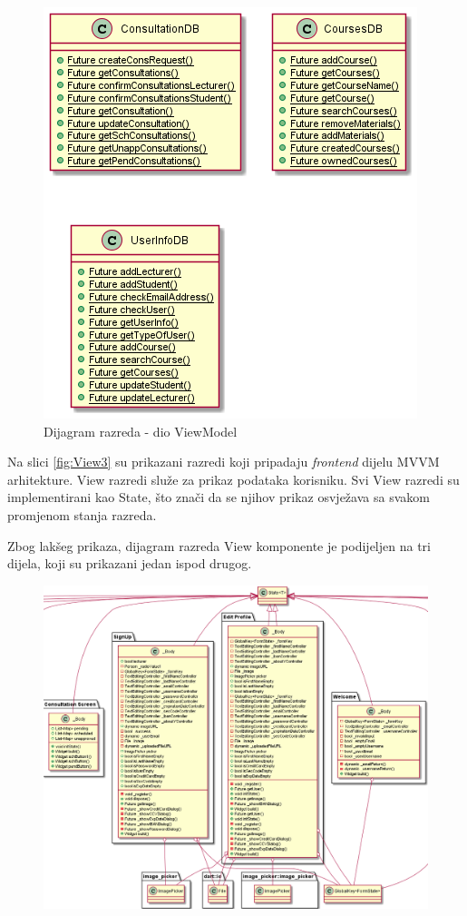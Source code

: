 			
			\begin{figure}[h]
				\includegraphics[scale=0.8]{dijagrami/ViewModel.PNG}
				\centering
				\caption{Dijagram razreda - dio ViewModel}
				\label{fig:ViewModel}
			\end{figure}
			
			Na slici \ref{fig:View3} su prikazani razredi koji pripadaju \textit{frontend} dijelu MVVM arhitekture. View razredi služe za prikaz podataka korisniku. Svi View razredi su implementirani kao State, što znači da se njihov prikaz osvježava sa svakom promjenom stanja razreda.
			
			Zbog lakšeg prikaza, dijagram razreda View komponente je podijeljen na tri dijela, koji su prikazani jedan ispod drugog.
			
			\eject
			\begin{figure}[h]
				\includegraphics[scale=0.41]{dijagrami/View1.PNG}
				\centering
			\end{figure}
			
